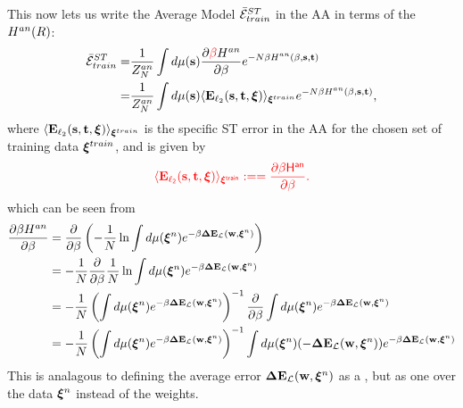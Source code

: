 %
This now lets us write the Average Model \TrainingError $\bar{\mathcal{E}}^{ST}_{train}$ in the AA in terms of the \AnnealedHamiltonian $H^{an}(R)$:
  \begin{align}
  \nonumber
  \AVGSTTE
   =& \dfrac{1}{Z^{an}_{\ND}}\int d\mu(\SVEC)\dfrac{\partial \red{\beta}\HAN}{\partial \beta} e^{-\ND\beta\HAN(\beta,\SVEC,\TVEC)} \\ 
  \label{eqn:EtM2}
   =& \dfrac{1}{Z^{an}_{\ND}}\int d\mu(\SVEC)\langle  \mathbf{E}_{\ell_2}(\SVEC,\TVEC,\XI) \rangle_{\XItrain} e^{-\ND\beta\HAN(\beta,\SVEC,\TVEC)}  ,
  \end{align}
  where $\langle \mathbf{E}_{\ell_2}({\mathbf{s}},{\mathbf{t}},\boldsymbol{\xi}) \rangle_{\boldsymbol{\xi}^{train}}$
  is the specific ST error in the AA for the chosen set of training data $\boldsymbol{\xi}^{train}$, and is given by
 \begin{align}
  {\color{red}\sf{ \langle  \mathbf{E}_{\ell_2}({\mathbf{s}},{\mathbf{t}},\boldsymbol{\xi}) \rangle_{\boldsymbol{\xi}^{train}}:==\dfrac{\partial \beta H^{an}}{\partial \beta}.}}
 \end{align}
 which can be seen from
 \begin{align}
  \label{eqn:partial_Gan}
  \dfrac{\partial \beta\HAN}{\partial \beta}
  &=  \dfrac{\partial }{\partial \beta} \left(-\frac{1}{\ND}\ln \int d\mu(\NDXIn)e^{-\beta\DETOPXI}\right) \\ \nonumber
  &=  -\frac{1}{\ND}\dfrac{\partial }{\partial \beta} \frac{1}{\ND}\ln \int d\mu(\NDXIn)e^{-\beta\DETOPXI} \\ \nonumber
  &=  -\frac{1}{\ND} \left( \int d\mu(\NDXIn)e^{-\beta\DETOPXI}\right)^{-1}\dfrac{\partial }{\partial \beta} \int d\mu(\NDXIn)e^{-\beta\DETOPXI} \\ \nonumber
    &=  -\frac{1}{\ND} \left(\int d\mu(\NDXIn)e^{-\beta\DETOPXI}\right)^{-1} \int d\mu(\NDXIn)(-\DETOPXI)e^{-\beta\DETOPXI}
 \end{align}
This is analagous to defining the average error $\mathbf{\Delta {E}}_{\mathcal{L}}(\mathbf{w}, \boldsymbol{\xi}^{n})$ as a \ThermalAverage, but as one over the data $\boldsymbol{\xi}^{n}$ instead of the weights.

